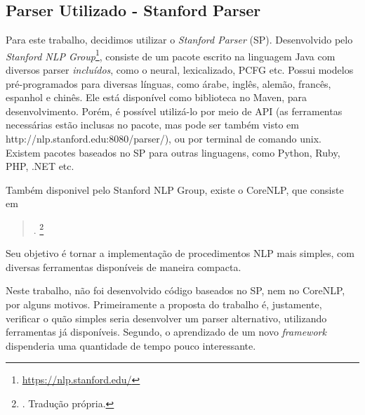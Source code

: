 \subsection{Parser Utilizado - Stanford Parser}
\label{sec:stanfordParser}
Para este trabalho, decidimos utilizar o \textit{Stanford Parser} (SP). Desenvolvido pelo \textit{Stanford NLP Group}\footnote{\url{https://nlp.stanford.edu/}}, consiste de um pacote escrito na linguagem Java com diversos parser \textit{incluídos}, como o neural, lexicalizado, PCFG etc. Possui modelos pré-programados para diversas línguas, como árabe, inglês, alemão, francês, espanhol e chinês. Ele está disponível como biblioteca no Maven, para desenvolvimento. Porém, é possível utilizá-lo por meio de API (as ferramentas necessárias estão inclusas no pacote, mas pode ser também visto em http://nlp.stanford.edu:8080/parser/), ou por terminal de comando unix. Existem pacotes baseados no SP para outras linguagens, como Python, Ruby, PHP, .NET etc.

Também disponivel pelo Stanford NLP Group, existe o CoreNLP, que consiste em \cite[p~55]{manning2014CoreNLP} 
\begin{quote}
    .
    \footnote{. Tradução própria.}
\end{quote}
Seu objetivo é tornar a implementação de procedimentos NLP mais simples, com diversas ferramentas disponíveis de maneira compacta.

Neste trabalho, não foi desenvolvido código baseados no SP, nem no CoreNLP, por alguns motivos. Primeiramente a proposta do trabalho é, justamente, verificar o quão simples seria desenvolver um parser alternativo, utilizando ferramentas já disponíveis. Segundo, o aprendizado de um novo \textit{framework} dispenderia uma quantidade de tempo pouco interessante.

